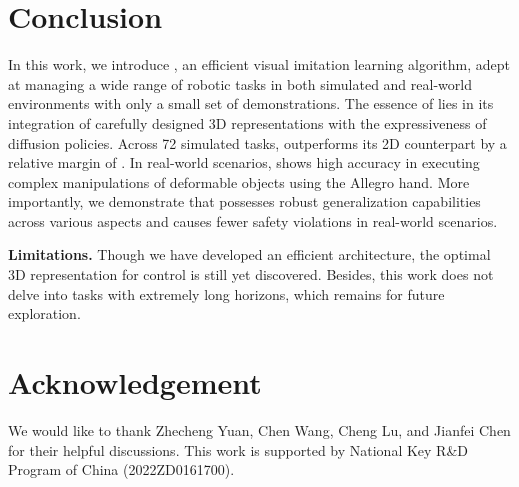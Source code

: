 \section{Conclusion}
In this work, we introduce \oursfull, an efficient visual imitation learning algorithm, adept at managing a wide range of robotic tasks in both simulated and real-world environments with only a small set of demonstrations. The essence of \ours lies in its integration of carefully designed 3D representations with the expressiveness of diffusion policies. Across 72 simulated tasks,  \ours outperforms its 2D counterpart by a relative margin of .  In real-world scenarios, \ours shows high accuracy in executing complex manipulations of deformable objects using the Allegro hand. More importantly, we demonstrate that \ours possesses robust generalization capabilities across various aspects and causes fewer safety violations in real-world scenarios. 


\noindent\textbf{Limitations.} Though we have developed an efficient architecture, the optimal 3D representation for control is still yet discovered. Besides, this work does not delve into tasks with extremely long horizons, which remains for future exploration.



\section*{Acknowledgement}
We would like to thank Zhecheng Yuan, Chen Wang, Cheng Lu, and Jianfei Chen for their helpful discussions. This work is supported by National Key R\&D Program of China (2022ZD0161700).


